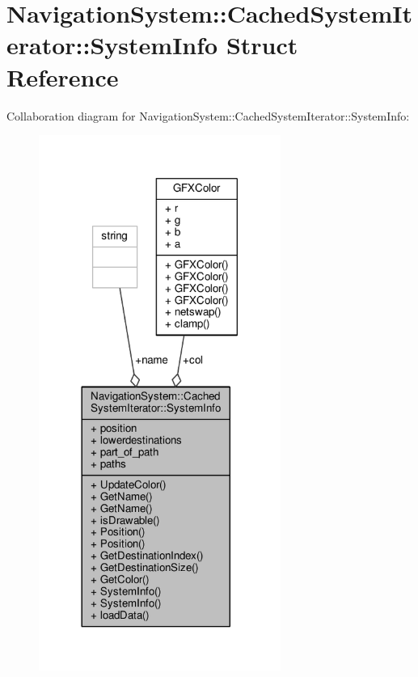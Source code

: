 \hypertarget{structNavigationSystem_1_1CachedSystemIterator_1_1SystemInfo}{}\section{Navigation\+System\+:\+:Cached\+System\+Iterator\+:\+:System\+Info Struct Reference}
\label{structNavigationSystem_1_1CachedSystemIterator_1_1SystemInfo}


Collaboration diagram for Navigation\+System\+:\+:Cached\+System\+Iterator\+:\+:System\+Info\+:
\nopagebreak
\begin{figure}[H]
\begin{center}
\leavevmode
\includegraphics[width=224pt]{d6/d6f/structNavigationSystem_1_1CachedSystemIterator_1_1SystemInfo__coll__graph}
\end{center}
\end{figure}
